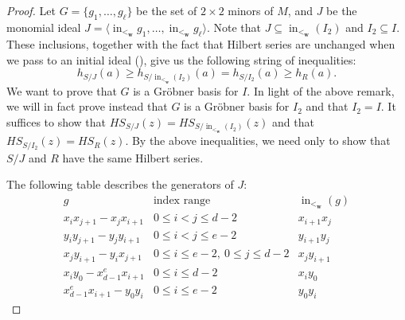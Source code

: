 \documentclass[12pt,reqno]{amsart}
\theoremstyle{definition}
\theoremstyle{remark}
\newcommand{\initial}{\operatorname{in}}
\newcommand{\bfw}{{\mathbf{w}}}
\newcommand{\ideal}[1]{{\langle #1 \rangle}}
\newcommand{\set}[1]{{\{ #1 \}}}
\begin{document}
\begin{proof}

Let $G = \set{g_1, \ldots, g_\ell}$ be the set of $2 \times 2$ minors of $M$, and $J$ be the monomial ideal $J = \ideal{\initial_{<_\bfw} g_1, \ldots, \initial_{<_\bfw} g_\ell}$. Note that $J \subseteq \initial_{<_\bfw}(I_2)$ and $I_2 \subseteq I$.  These inclusions, together with the fact that Hilbert series are unchanged when we pass to an initial ideal (\cite[Theorem~15.26]{eCommAlgWAViewTAlgGeom}), give us the following string of inequalities:
\[
h_{S/J}(a) \geq h_{S/\initial_{<_\bfw}(I_2)}(a) = h_{S/I_2}(a) \geq h_R(a).
\]
We want to prove that $G$ is a Gr\"obner basis for $I$.  In light of the above remark, we will in fact prove instead that $G$ is a Gr\"obner basis for $I_2$ and that $I_2 = I$.  It suffices to show that $HS_{S/J}(z) = HS_{S/\initial_{<_\bfw}(I_2)}(z)$ and that $HS_{S/{I_2}}(z) = HS_R(z)$.  By the above inequalities, we need only to show that $S/J$ and $R$ have the same Hilbert series.

The following table describes the generators of $J$: 
\[
\begin{array}{c|l|l}
g & \text{index range} & \initial_{<_\bfw}(g) \\
\hline 
    x_i x_{j+1} - x_j x_{i+1} & 
    0 \leq i < j \leq d-2 & 
    x_{i+1}x_j \\ 
\hline 
    y_i y_{j+1} - y_j y_{i+1} & 
    0 \leq i < j \leq e-2 &
    y_{i+1}y_j \\
\hline 
    x_j y_{i+1} - y_ix_{j+1} & 
    0 \leq i \leq e-2, \ 0 \leq j \leq d-2 &
    x_j y_{i+1} \\
\hline 
    x_i y_0 - x_{d-1}^e x_{i+1} &
    0 \leq i \leq d-2 &
    x_i y_0 \\
\hline 
    x_{d-1}^e x_{i+1} - y_0y_i &
    0 \leq i \leq e-2 & 
    y_0y_i
\end{array}
\]


\end{proof}
\end{document}
